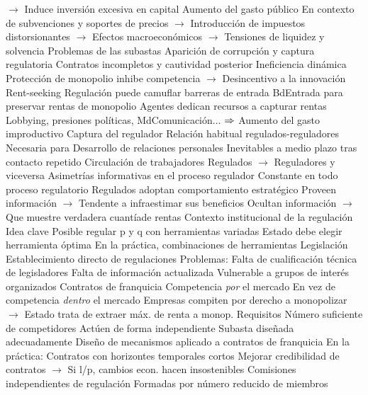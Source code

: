 \documentclass{nuevotema}
\begin{document}
\begin{esquemal}
				\4[] $\to$ Induce inversión excesiva en capital
				\4 Aumento del gasto público
				\4[] En contexto de subvenciones y soportes de precios
				\4[] $\to$ Introducción de impuestos distorsionantes
				\4[] $\to$ Efectos macroeconómicos
				\4[] $\to$ Tensiones de liquidez y solvencia
				\4 Problemas de las subastas
				\4[] Aparición de corrupción y captura regulatoria
				\4[] Contratos incompletos y cautividad posterior
				\4 Ineficiencia dinámica
				\4[] Protección de monopolio inhibe competencia
				\4[] $\to$ Desincentivo a la innovación
			\3 Rent-seeking
				\4 Regulación puede camuflar barreras de entrada
				\4[] BdEntrada para preservar rentas de monopolio
				\4 Agentes dedican recursos a capturar rentas
				\4[] Lobbying, presiones políticas, MdComunicación...
				\4[] $\Rightarrow$ Aumento del gasto improductivo
			\3 Captura del regulador
				\4 Relación habitual regulados-reguladores
				\4[] Necesaria para
				\4 Desarrollo de relaciones personales
				\4[] Inevitables a medio plazo tras contacto repetido
				\4 Circulación de trabajadores
				\4[] Regulados $\to$ Reguladores y viceversa
			\3 Asimetrías informativas en el proceso regulador
				\4 Constante en todo proceso regulatorio
				\4 Regulados adoptan comportamiento estratégico
				\4[] Proveen información
				\4[] $\to$ Tendente a infraestimar sus beneficios
				\4[] Ocultan información
				\4[] $\to$ Que muestre verdadera cuantíade rentas
		\2 Contexto institucional de la regulación
			\3 Idea clave
				\4 Posible regular p y q con herramientas variadas
				\4 Estado debe elegir herramienta óptima
				\4 En la práctica, combinaciones de herramientas
			\3 Legislación
				\4 Establecimiento directo de regulaciones
				\4 Problemas:
				\4[] Falta de cualificación técnica de legisladores
				\4[] Falta de información actualizada
				\4[] Vulnerable a grupos de interés organizados
			\3 Contratos de franquicia
				\4 Competencia \textit{por} el mercado
				\4[] En vez de competencia \textit{dentro} el mercado
				\4 Empresas compiten por derecho a monopolizar
				\4[] $\to$ Estado trata de extraer máx. de renta a monop.
				\4 Requisitos
				\4[] Número suficiente de competidores
				\4[] Actúen de forma independiente
				\4[] Subasta diseñada adecuadamente
				\4 Diseño de mecanismos aplicado a contratos de franquicia
				\4 En la práctica:
				\4[] Contratos con horizontes temporales cortos
				\4[] Mejorar credibilidad de contratos
				\4[] $\to$ Si l/p, cambios econ. hacen insostenibles
			\3 Comisiones independientes de regulación
				\4 Formadas por número reducido de miembros

\end{esquemal}
\end{document}
